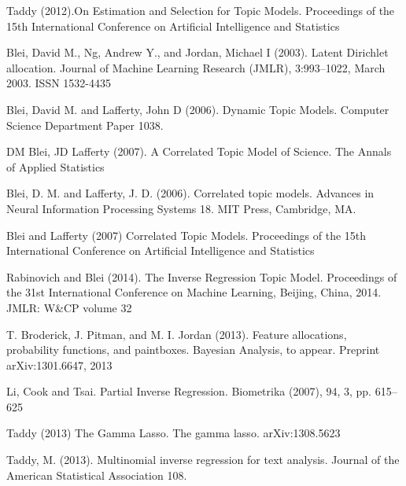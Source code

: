 \documentclass[12pt]{article}
\begin{document}
\begin{thebibliography}{99}

 Taddy (2012).On Estimation and Selection for Topic Models.  Proceedings of the 15th International Conference on Artificial Intelligence and Statistics

 Blei, David M., Ng, Andrew Y., and Jordan, Michael I (2003). Latent Dirichlet allocation. Journal of Machine Learning Research (JMLR), 3:993–1022, March 2003. ISSN 1532-4435

 Blei, David M. and Lafferty, John D (2006). Dynamic Topic Models. Computer Science Department Paper 1038.

 DM Blei, JD Lafferty (2007). A Correlated Topic Model of Science. The Annals of Applied Statistics

 Blei, D. M. and Lafferty, J. D. (2006). Correlated topic models. Advances in Neural Information Processing Systems 18. MIT Press, Cambridge, MA.

  Blei and Lafferty (2007) Correlated Topic Models. Proceedings of the 15th International Conference on Artificial Intelligence and Statistics

 Rabinovich and Blei (2014). The Inverse Regression Topic Model. Proceedings of the 31st International Conference on Machine Learning, Beijing, China, 2014. JMLR: W\&CP volume 32

T. Broderick, J. Pitman, and M. I. Jordan (2013). Feature allocations, probability functions, and paintboxes. Bayesian Analysis, to appear. Preprint arXiv:1301.6647, 2013

  Li, Cook  and Tsai. Partial Inverse Regression. Biometrika (2007), 94, 3, pp. 615–625

 Taddy (2013) The Gamma Lasso. The gamma lasso. arXiv:1308.5623

 Taddy, M. (2013). Multinomial inverse regression for text analysis. Journal of the American Statistical Association 108.

\end{thebibliography}
\end{document}
